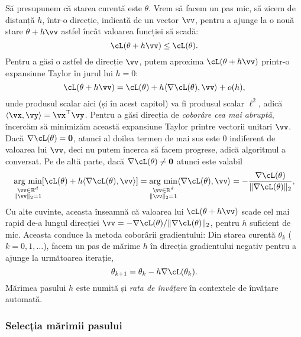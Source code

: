 \documentclass[../../book-main_ro.tex]{subfiles}
\begin{document}
Să presupunem că starea curentă este $\theta$. Vrem să facem un pas mic, să zicem de distanță $h$, într-o direcție, indicată de un vector $\vv$, pentru a ajunge la o nouă stare $\theta + h\vv$ astfel încât valoarea funcției să scadă:
\begin{equation}
    \cL(\theta + h\vv) \leq \cL(\theta).
\end{equation}
Pentru a găsi o astfel de direcție $\vv$, putem aproxima $\cL(\theta + h\vv)$ printr-o expansiune Taylor în jurul lui \(h = 0\):
\begin{equation}
    \cL(\theta + h\vv) = \cL(\theta) + h\ip{\nabla \cL(\theta)}{\vv} + o(h),
\end{equation}
unde produsul scalar aici (și în acest capitol) va fi produsul scalar \(\ell^{2}\), adică \(\ip{\vx}{\vy} = \vx^{\top}\vy\). Pentru a găsi direcția de \textit{coborâre cea mai abruptă}, încercăm să minimizăm această expansiune Taylor printre vectorii unitari \(\vv\). Dacă \(\nabla \cL(\theta) = \vzero\), atunci al doilea termen de mai sus este \(0\) indiferent de valoarea lui \(\vv\), deci nu putem încerca să facem progrese, adică algoritmul a conversat. Pe de altă parte, dacă \(\nabla \cL(\theta) \neq \vzero\) atunci este valabil
\begin{equation}\label{eq:steepest_descent_l2_norm}
    \argmin_{\substack{\vv \in \R^{d} \\ \norm{\vv}_{2} = 1}} [\cL(\theta) + h\ip{\nabla \cL(\theta)}{\vv}] = \argmin_{\substack{\vv \in \R^{d} \\ \norm{\vv}_{2} = 1}} \ip{\nabla \cL(\theta)}{\vv} = -\frac{\nabla \cL(\theta)}{\norm{\nabla \cL(\theta)}_{2}},
\end{equation}
Cu alte cuvinte, aceasta înseamnă că valoarea lui \(\cL(\theta + h\vv)\) scade cel mai rapid de-a lungul direcției \(\vv = -\nabla \cL(\theta) / \norm{\nabla \cL(\theta)}_{2}\), pentru \(h\) suficient de mic. Aceasta conduce la metoda coborârii gradientului: Din starea curentă $\theta_k$ ($k=0, 1, \ldots$), facem un pas de mărime $h$ în direcția gradientului negativ pentru a ajunge la următoarea iterație,
\begin{equation}
    \theta_{k+1} = \theta_k - h \nabla \cL(\theta_k). 
\end{equation}
Mărimea pasului \(h\) este numită și \textit{rata de învățare} în contextele de învățare automată.

\subsubsection{Selecția mărimii pasului}
\end{document}
